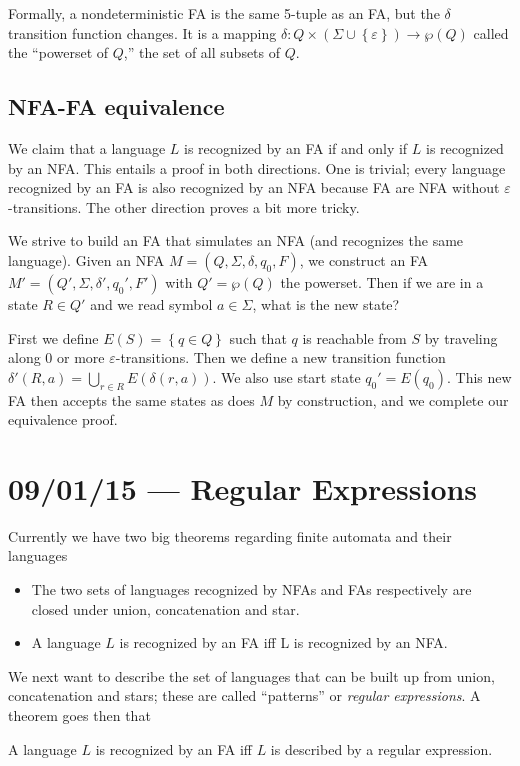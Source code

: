 \documentclass[10pt]{report}
\begin{document}
Formally, a nondeterministic FA is the same 5-tuple as an FA, but the $\delta$ transition function changes. It is a mapping $\delta: Q \times \left( \Sigma \cup \left\{ \varepsilon \right\} \right) \to \wp(Q)$ called the ``powerset of $Q$,'' the set of all subsets of $Q$. 

\section{NFA-FA equivalence}

We claim that a language $L$ is recognized by an FA if and only if $L$ is recognized by an NFA. This entails a proof in both directions. One is trivial; every language recognized by an FA is also recognized by an NFA because FA are NFA without $\varepsilon$-transitions. The other direction proves a bit more tricky.

We strive to build an FA that simulates an NFA (and recognizes the same language). Given an NFA $M = (Q,\Sigma, \delta, q_0, F)$, we construct an FA $M' = (Q', \Sigma, \delta', q_0', F')$ with $Q' = \wp(Q)$ the powerset. Then if we are in a state $R \in Q'$ and we read symbol $a \in \Sigma$, what is the new state? 

First we define $E(S) = \left\{ q \in Q \right\}$ such that $q$ is reachable from $S$ by traveling along $0$ or more $\varepsilon$-transitions. Then we define a new transition function $\delta'(R,a) = \bigcup_{r \in R} E(\delta(r,a))$. We also use start state $q_0' = E(q_0)$. This new FA then accepts the same states as does $M$ by construction, and we complete our equivalence proof. 

\chapter{09/01/15 --- Regular Expressions}

Currently we have two big theorems regarding finite automata and their languages
\begin{itemize}
    \item The two sets of languages recognized by NFAs and FAs respectively are closed under union, concatenation and star.
    \item A language $L$ is recognized by an FA iff L is recognized by an NFA.
\end{itemize}

We next want to describe the set of languages that can be built up from union, concatenation and stars; these are called ``patterns'' or \emph{regular expressions}. A theorem goes then that
\begin{center}
    A language $L$ is recognized by an FA iff $L$ is described by a regular expression.
\end{center}
\end{document}
